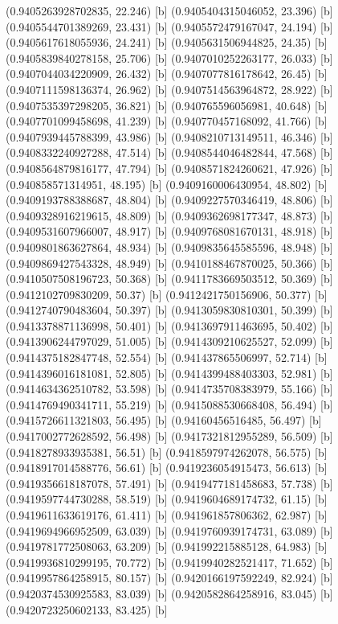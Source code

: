 {{{(0.9405263928702835, 22.246) [b] 
(0.9405404315046052, 23.396) [b] 
(0.9405544701389269, 23.431) [b] 
(0.9405572479167047, 24.194) [b] 
(0.9405617618055936, 24.241) [b] 
(0.9405631506944825, 24.35) [b] 
(0.9405839840278158, 25.706) [b] 
(0.9407010252263177, 26.033) [b] 
(0.9407044034220909, 26.432) [b] 
(0.9407077816178642, 26.45) [b] 
(0.9407111598136374, 26.962) [b] 
(0.9407514563964872, 28.922) [b] 
(0.9407535397298205, 36.821) [b] 
(0.940765596056981, 40.648) [b] 
(0.9407701099458698, 41.239) [b] 
(0.940770457168092, 41.766) [b] 
(0.9407939445788399, 43.986) [b] 
(0.9408210713149511, 46.346) [b] 
(0.9408332240927288, 47.514) [b] 
(0.9408544046482844, 47.568) [b] 
(0.9408564879816177, 47.794) [b] 
(0.9408571824260621, 47.926) [b] 
(0.940858571314951, 48.195) [b] 
(0.9409160006430954, 48.802) [b] 
(0.9409193788388687, 48.804) [b] 
(0.9409227570346419, 48.806) [b] 
(0.9409328916219615, 48.809) [b] 
(0.9409362698177347, 48.873) [b] 
(0.9409531607966007, 48.917) [b] 
(0.9409768081670131, 48.918) [b] 
(0.9409801863627864, 48.934) [b] 
(0.9409835645585596, 48.948) [b] 
(0.9409869427543328, 48.949) [b] 
(0.9410188467870025, 50.366) [b] 
(0.9410507508196723, 50.368) [b] 
(0.9411783669503512, 50.369) [b] 
(0.9412102709830209, 50.37) [b] 
(0.9412421750156906, 50.377) [b] 
(0.9412740790483604, 50.397) [b] 
(0.9413059830810301, 50.399) [b] 
(0.9413378871136998, 50.401) [b] 
(0.9413697911463695, 50.402) [b] 
(0.9413906244797029, 51.005) [b] 
(0.9414309210625527, 52.099) [b] 
(0.9414375182847748, 52.554) [b] 
(0.941437865506997, 52.714) [b] 
(0.9414396016181081, 52.805) [b] 
(0.9414399488403303, 52.981) [b] 
(0.9414634362510782, 53.598) [b] 
(0.9414735708383979, 55.166) [b] 
(0.9414769490341711, 55.219) [b] 
(0.9415088530668408, 56.494) [b] 
(0.9415726611321803, 56.495) [b] 
(0.94160456516485, 56.497) [b] 
(0.9417002772628592, 56.498) [b] 
(0.9417321812955289, 56.509) [b] 
(0.9418278933935381, 56.51) [b] 
(0.9418597974262078, 56.575) [b] 
(0.9418917014588776, 56.61) [b] 
(0.9419236054915473, 56.613) [b] 
(0.9419356618187078, 57.491) [b] 
(0.9419477181458683, 57.738) [b] 
(0.9419597744730288, 58.519) [b] 
(0.9419604689174732, 61.15) [b] 
(0.9419611633619176, 61.411) [b] 
(0.941961857806362, 62.987) [b] 
(0.9419694966952509, 63.039) [b] 
(0.9419760939174731, 63.089) [b] 
(0.9419781772508063, 63.209) [b] 
(0.941992215885128, 64.983) [b] 
(0.9419936810299195, 70.772) [b] 
(0.9419940282521417, 71.652) [b] 
(0.9419957864258915, 80.157) [b] 
(0.9420166197592249, 82.924) [b] 
(0.9420374530925583, 83.039) [b] 
(0.9420582864258916, 83.045) [b] 
(0.9420723250602133, 83.425) [b] 
}}}
